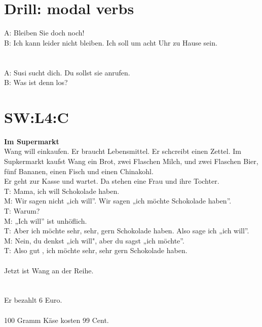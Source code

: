 \section{Drill: modal verbs}

A: Bleiben Sie doch noch! \\
B: Ich kann leider nicht bleiben. Ich soll um acht Uhr zu Hause sein.  \\
\\
\\
A: Susi sucht dich. Du sollst sie anrufen.  \\
B: Was ist denn los? \\

\section{SW:L4:C}
\textbf{Im Supermarkt} \\
Wang will einkaufen. Er braucht Lebensmittel. Er schcreibt einen Zettel.  Im Supkermarkt kaufst Wang ein Brot, zwei Flaschen Milch, und zwei Flaschen Bier, fünf Bananen, einen Fisch und einen Chinakohl. \\
Er geht zur Kasse  und wartet. Da stehen eine Frau und ihre Tochter. \\
T: Mama, ich will Schokolade haben. \\
M: Wir sagen nicht „ich will”. Wir sagen „ich möchte Schokolade haben”. \\
T: Warum? \\
M: „Ich will” ist unhöflich.  \\
T: Aber ich möchte sehr, sehr, gern Schokolade haben. Also  sage ich „ich will”. \\
M: Nein, du denkst „ich will", aber du sagst „ich möchte”. \\
T: Also gut , ich möchte sehr, sehr gern Schokolade haben. \\
\\
Jetzt ist Wang an der Reihe. \\
\\
\\
Er bezahlt  6 Euro. \\
\\
100 Gramm Käse kosten 99 Cent. \\

